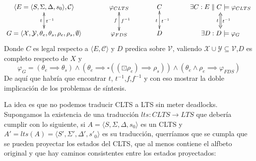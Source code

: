 \[\xymatrix@C+1pc{
	\langle E = \langle S, \Sigma, \Delta, s_0 \rangle, \mathcal{C} \rangle \ar@{<->}[d]^{t^{-1}}_{t}
	& \varphi_{CLTS}\ar@{<->}[d]^{f^{-1}}_{f}
	& C\ar@{<->}[d]^{t^{-1}}_{t}
	& \exists C: E\parallel C \models  \varphi_{CLTS}\ar@{<=>}[d]^{t^{-1}}_{t}\\
	G = \langle \mathcal{X},\mathcal{Y},\theta_e,\theta_s,\rho_e,\rho_s, \emptyset \rangle
	& \varphi_{FDS}
	& D
	&\exists D: D \models \varphi_G\\
}\]
Donde $C$ es legal respecto a $\langle E,\mathcal{C} \rangle$ y $D$ predica sobre $\mathcal{V}$, valiendo $\mathcal{X} \cup \mathcal{Y} \subseteq \mathcal{V}$,$D$ es completo respecto de $X$ y
\[\varphi_G = (\theta_e \implies \theta_s) \wedge (\theta_e \implies \square((\boxdot \rho_e) \implies \rho_s)) \wedge (\theta_e \wedge \rho_e \implies \varphi_{FDS}) \]
De aquí que habría que encontrar $t$, $t^{-1}$,$f$,$f^{-1}$ y con eso mostrar la doble implicación de los problemas de síntesis.
\newpage

La idea es que no podemos traducir CLTS a LTS sin meter deadlocks.
Supongamos la existencia de una traducción $lts:CLTS \rightarrow LTS$ que debería cumplir con lo siguiente, si $A=\langle S, \Sigma, \Delta, s_0 \rangle$ es un CLTS y $A'=lts(A)=\langle S', \Sigma', \Delta', s'_0 \rangle$ es su traducción, querríamos que se cumpla que se pueden proyectar los estados del CLTS, que al menos contiene el alfbeto original y que hay caminos consistentes entre los estados proyectados:


